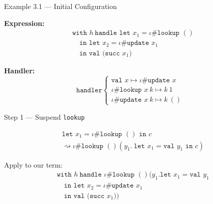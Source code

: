 
\begin{frame}{Example 3.1 — Initial Configuration}

\textbf{Expression:}
\begin{align*}
&\texttt{with } h\ \texttt{handle let } x_1 = \iota \# \texttt{lookup }() \\
&\quad \texttt{in let } x_2 = \iota \# \texttt{update } x_1 \\
&\quad \texttt{in val (succ } x_1)
\end{align*}

\textbf{Handler:}
\[
\texttt{handler}
\begin{cases}
  \texttt{val } x \mapsto \iota \# \texttt{update } x \\
  \iota \# \texttt{lookup } x\ k \mapsto k\ 1 \\
  \iota \# \texttt{update } x\ k \mapsto k\ ()
\end{cases}
\]
\end{frame}

\begin{frame}{Step 1 — Suspend \texttt{lookup}}

\begin{align*}
&\texttt{let } x_1 = \iota \# \texttt{lookup }() \texttt{ in } c \\
&\rightsquigarrow \iota \# \texttt{lookup }() \left(y_1.\ \texttt{let } x_1 = \texttt{val } y_1 \texttt{ in } c\right)
\end{align*}

Apply to our term:
\begin{align*}
&\texttt{with } h\ \texttt{handle } \iota \# \texttt{lookup }() \Big(y_1. \texttt{let } x_1 = \texttt{val } y_1 \\
&\quad \texttt{in let } x_2 = \iota \# \texttt{update } x_1 \\
&\quad \texttt{in val (succ } x_1)\Big)
\end{align*}
\end{frame}

